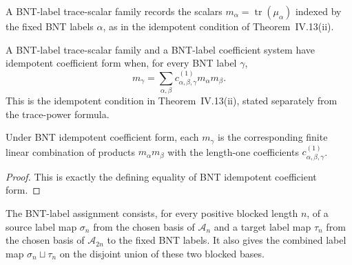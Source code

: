 \begin{definition}%
    \label{def:mpdo_bnt_label_trace_scalar_family}
    \leanok
    A BNT-label trace-scalar family records the scalars
    $m_\alpha=\operatorname{tr}(\mu_\alpha)$ indexed by the fixed BNT labels
    $\alpha$, as in the idempotent condition of Theorem~IV.13(ii).
\end{definition}

\begin{definition}%
    \label{def:mpdo_bnt_label_idempotent_coefficient_form}
    \leanok
    A BNT-label trace-scalar family and a BNT-label coefficient system have
    idempotent coefficient form when, for every BNT label $\gamma$,
    \[
        m_\gamma =
        \sum_{\alpha,\beta}
        c^{(1)}_{\alpha,\beta,\gamma}m_\alpha m_\beta.
    \]
    This is the idempotent condition in Theorem~IV.13(ii), stated separately
    from the trace-power formula.
\end{definition}

\begin{theorem}%
    \label{thm:mpdo_bnt_label_idempotent_coefficient_eq_sum}
    \leanok
    Under BNT idempotent coefficient form, each $m_\gamma$ is the
    corresponding finite linear combination of products $m_\alpha m_\beta$
    with the length-one coefficients $c^{(1)}_{\alpha,\beta,\gamma}$.
\end{theorem}
\begin{proof}\leanok
    This is exactly the defining equality of BNT idempotent coefficient form.
\end{proof}

\begin{definition}%
    \label{def:mpdo_bnt_blocked_basis_label_assignment}
    \leanok
    The BNT-label assignment consists, for every positive blocked length $n$,
    of a source label map $\sigma_n$ from the chosen basis of
    $\mathcal A_n$ and a target label map $\tau_n$ from the chosen basis of
    $\mathcal A_{2n}$ to the fixed BNT labels. It also gives the combined
    label map $\sigma_n \sqcup \tau_n$ on the disjoint union of these two
    blocked bases.
\end{definition}

